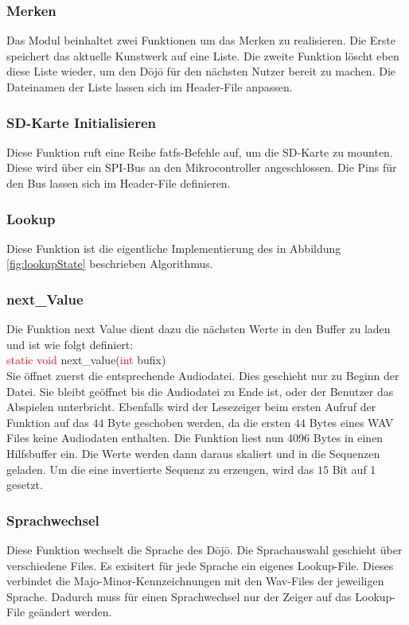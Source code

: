 \subsubsection*{Merken}
Das Modul beinhaltet zwei Funktionen um das Merken zu realisieren. Die Erste speichert das aktuelle Kunstwerk auf eine Liste. Die zweite Funktion löscht eben diese Liste wieder, um den Dōjō für den nächsten Nutzer bereit zu machen. Die Dateinamen der Liste lassen sich im Header-File anpassen.

\subsubsection*{SD-Karte Initialisieren}
Diese Funktion ruft eine Reihe fatfs-Befehle auf, um die SD-Karte zu mounten. Diese wird über ein SPI-Bus an den Mikrocontroller angeschlossen. Die Pins für den Bus lassen sich im Header-File definieren.

\subsubsection*{Lookup}
Diese Funktion ist die eigentliche Implementierung des in Abbildung \ref{fig:lookupState} beschrieben Algorithmus.

\subsubsection*{next\_Value}
Die Funktion next Value dient dazu die nächsten Werte in den Buffer zu laden und ist wie folgt definiert:\\
\textcolor{red}{static void} next\_value(\textcolor{red}{int} bufix)\\
Sie öffnet zuerst die entsprechende Audiodatei. Dies geschieht nur zu Beginn der Datei. Sie bleibt geöffnet bis die Audiodatei zu Ende ist, oder der Benutzer das Abspielen unterbricht. Ebenfalls wird der Lesezeiger beim ersten Aufruf der Funktion auf das $44$ Byte geschoben werden, da die ersten $44$ Bytes eines WAV Files keine Audiodaten enthalten. Die Funktion liest nun 4096 Bytes in einen Hilfsbuffer ein. Die Werte werden dann daraus skaliert und in die Sequenzen geladen. Um die eine invertierte Sequenz zu erzeugen, wird das $15$ Bit auf 1 gesetzt.

\subsubsection*{Sprachwechsel}
Diese Funktion wechselt die Sprache des Dōjō. Die Sprachauswahl geschieht über verschiedene Files. Es exisitert für jede Sprache ein eigenes Lookup-File. Dieses verbindet die Majo-Minor-Kennzeichnungen mit den Wav-Files der jeweiligen Sprache. Dadurch muss für einen Sprachwechsel nur der Zeiger auf das Lookup-File geändert werden.

